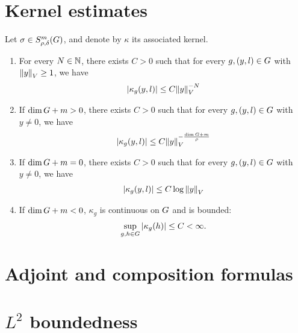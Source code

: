 \section{Kernel estimates}

\begin{theorem}
\label{theorem:kernel_estimates}
    Let $\sigma \in S^{m}_{\rho, \delta}(G)$, and denote by $\kappa$ its associated kernel.
    \begin{enumerate}
        \item For every $N \in \mathbb{N}$, there exists $C > 0$ such that for every $g, (y, l) \in G$ with ${\left\| y \right\|}_{V} \geq 1$, we have
            \begin{align*}
                \left|{\kappa_g(y, l)}\right| \leq C {\left\| y \right\|}_{V}^{-N}
            \end{align*}
        \item If $\dim G + m > 0$, there exists $C > 0$ such that for every $g, (y, l) \in G$ with $y \neq 0$, we have
            \begin{align*}
                \left|{\kappa_g(y, l)}\right| \leq C {\left\| y \right\|}_{V}^{- \frac{\dim G + m}{\rho}}
            \end{align*}
        \item If $\dim G + m = 0$, there exists $C > 0$ such that for every $g, (y, l) \in G$ with $y \neq 0$, we have
            \begin{align*}
                \left|{\kappa_g(y, l)}\right| \leq C \log {\left\| y \right\|}_{V}
            \end{align*}
        \item If $\dim G + m < 0$, $\kappa_g$ is continuous on $G$ and is bounded:
            \begin{align*}
                \sup_{g, h \in G} \left|{\kappa_g(h)}\right| \leq C < \infty.
            \end{align*}
    \end{enumerate}
\end{theorem}

\section{Adjoint and composition formulas}

\section{$L^2$ boundedness}
